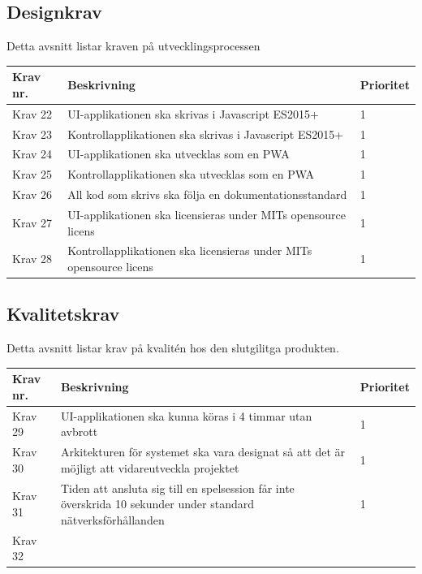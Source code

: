 \documentclass[10pt]{article}
\begin{document}
	\subsection{Designkrav}
	Detta avsnitt listar kraven på utvecklingsprocessen
	
	\begin{tabular}{| p{2cm} | p{8cm} | p{2cm}|}
		\hline
		\textbf{Krav nr.} & \textbf{Beskrivning} & \textbf{Prioritet} \\ \hline
		
		Krav 22 & UI-applikationen ska skrivas i Javascript ES2015+ & 1 \\ \hline
		Krav 23 & Kontrollapplikationen ska skrivas i Javascript ES2015+ & 1 \\ \hline
		Krav 24 & UI-applikationen ska utvecklas som en PWA & 1 \\ \hline
		Krav 25 & Kontrollapplikationen ska utvecklas som en PWA & 1 \\ \hline
		Krav 26 & All kod som skrivs ska följa en dokumentationsstandard & 1 \\ \hline
		Krav 27 & UI-applikationen ska licensieras under MITs opensource licens & 1 \\ \hline
		Krav 28 & Kontrollapplikationen ska licensieras under MITs opensource licens & 1 \\ \hline
	\end{tabular}

	\subsection{Kvalitetskrav}
	Detta avsnitt listar krav på kvalitén hos den slutgilitga produkten.
	
		\begin{tabular}{|p{2cm}|p{8cm}|p{2cm}|}
		\hline
		\textbf{Krav nr.} & \textbf{Beskrivning} & \textbf{Prioritet} \\ \hline
		Krav 29 & UI-applikationen ska kunna köras i 4 timmar utan avbrott & 1 \\ \hline
		Krav 30 & Arkitekturen för systemet ska vara designat så att det är möjligt att vidareutveckla projektet & 1 \\ \hline
		Krav 31 & Tiden att ansluta sig till en spelsession får inte överskrida 10 sekunder under standard nätverksförhållanden & 1 \\ \hline
		Krav 32 & & \\ \hline
		
	\end{tabular}
	
\pagebreak

\printbibliography
{}
\end{document}
